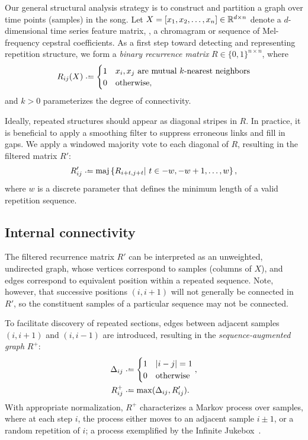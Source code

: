 \documentclass{article}
\begin{document}
Our general structural analysis strategy is to construct and partition a graph
over time points (samples) in the song.
Let $X = [x_1, x_2, \dots, x_n] \in \mathbb{R}^{d\times n}$ denote a $d$-dimensional time
series feature matrix, \eg, a chromagram or sequence of Mel-frequency cepstral 
coefficients.  As a first step toward detecting and representing repetition structure, 
we form a \emph{binary recurrence matrix} $R \in {\{0,1\}}^{n\times n}$, where 
\begin{equation}
R_{ij}(X) \defeq \begin{cases}
1 & x_i, x_j \text{ are mutual $k$-nearest neighbors}\\
0 & \text{otherwise},
\end{cases}
\label{unfiltered-rep}
\end{equation}
and $k > 0$ parameterizes the degree of connectivity.

Ideally, repeated structures should appear as diagonal stripes in $R$.
In practice, it is beneficial to apply a smoothing filter to suppress erroneous
links and fill in gaps.  We apply a windowed majority vote to each diagonal of
$R$, resulting in the filtered matrix $R'$:
\begin{equation}
R'_{ij} \defeq \maj\left\{ R_{i+t, j+t} \given t \in -w, -w+1, \dots, w\right\},
\label{filtered-rep}
\end{equation}
where $w$ is a discrete parameter that defines the minimum length of a valid
repetition sequence.

\subsection{Internal connectivity}
The filtered recurrence matrix $R'$ can be interpreted as an unweighted, undirected 
graph, whose vertices correspond to samples (columns of $X$), and edges correspond 
to equivalent position within a repeated sequence. Note, however, that successive 
positions $(i, i+1)$ will not generally be connected in $R'$, so the constituent 
samples of a particular sequence may not be connected.

To facilitate discovery of repeated sections, edges between adjacent samples $(i, i+1)$
and $(i, i-1)$ are introduced, resulting in the
\emph{sequence-augmented graph} $R^+$:
\begin{align}
\Delta_{ij} &\defeq \begin{cases}
1 & |i - j| = 1\\
0 & \text{otherwise}
\end{cases},\\
R^+_{ij} &\defeq \max(\Delta_{ij}, R'_{ij})\label{pathmatrix}.
\end{align}
With appropriate normalization, $R^+$ characterizes a Markov process over samples, 
where at each step $i$, the process either moves to an adjacent sample $i\pm1$, or 
a random repetition of $i$; a process exemplified by the 
Infinite Jukebox~\cite{infinitejukebox}.
\end{document}
